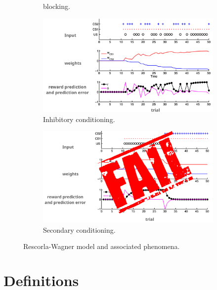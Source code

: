 \documentclass[11pt]{book} %
\begin{document}
\begin{figure}[ht]
\begin{subfigure}[b]{0.5\textwidth}
        \caption{blocking.}
        \label{fig:overshadowing}
    \end{subfigure}
    \begin{subfigure}[b]{0.5\textwidth}
        \centering
        \includegraphics[width=\textwidth]{./Figs/inhibitory_exp.jpeg}
        \caption{Inhibitory conditioning.}
        \label{fig:blocking}
    \end{subfigure}
    \begin{subfigure}[b]{0.5\textwidth}
        \centering
        \includegraphics[width=\textwidth]{./Figs/secondary_exp.jpeg}
        \caption{Secondary conditioning.}
        \label{fig:blocking}
    \end{subfigure}
    \label{fig:rescorla_wagner}
    \caption{Rescorla-Wagner model and associated phenomena.}
\end{figure}

%
%
%
%
%


\section{Definitions}
\end{document}
